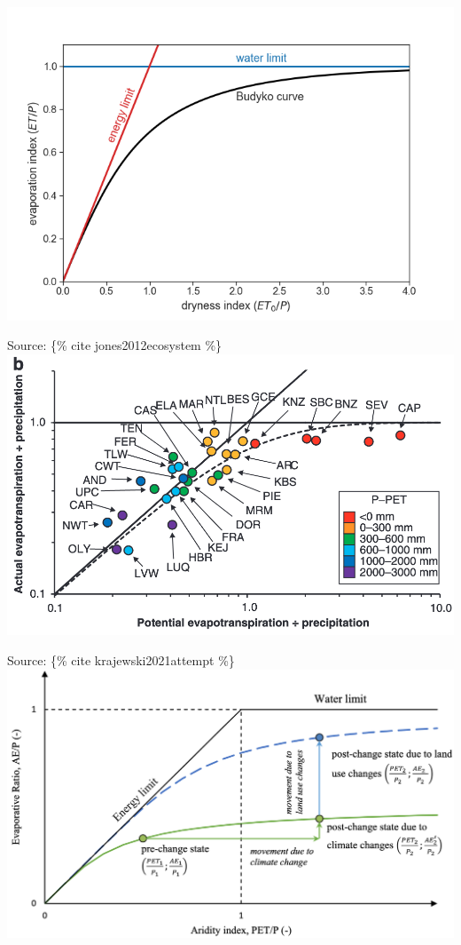 \documentclass[
  letterpaper,
  DIV=11,
  numbers=noendperiod]{scrreprt}
\begin{document}
\includegraphics{archive/figures/budyko2.png}

Source: \{\% cite jones2012ecosystem \%\}\\
\includegraphics{archive/figures/jones-creed-fig5b.png}

Source: \{\% cite krajewski2021attempt \%\}\\
\includegraphics{archive/figures/Krajewski-2021-fig1.png}
\end{document}
